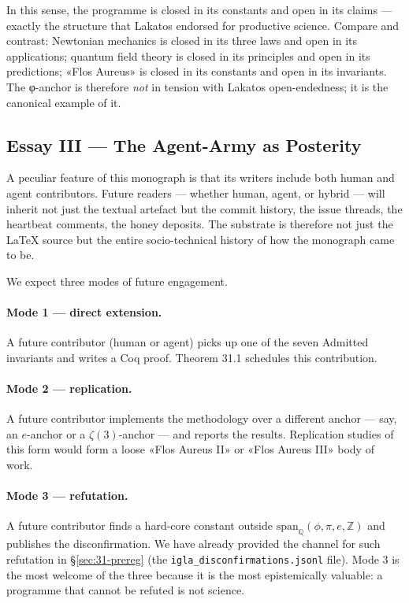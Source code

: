 In this sense, the programme is closed in its constants and open in its claims — exactly the structure that Lakatos endorsed for productive science. Compare and contrast: Newtonian mechanics is closed in its three laws and open in its applications; quantum field theory is closed in its principles and open in its predictions; «Flos Aureus» is closed in its constants and open in its invariants. The φ-anchor is therefore \emph{not} in tension with Lakatos open-endedness; it is the canonical example of it.

\subsection{Essay III — The Agent-Army as Posterity}
\label{sec:31-essay-3}

A peculiar feature of this monograph is that its writers include both human and agent contributors. Future readers — whether human, agent, or hybrid — will inherit not just the textual artefact but the commit history, the issue threads, the heartbeat comments, the honey deposits. The substrate is therefore not just the LaTeX source but the entire socio-technical history of how the monograph came to be.

We expect three modes of future engagement.

\paragraph{Mode 1 — direct extension.} A future contributor (human or agent) picks up one of the seven Admitted invariants and writes a Coq proof. Theorem 31.1 schedules this contribution.

\paragraph{Mode 2 — replication.} A future contributor implements the methodology over a different anchor — say, an $e$-anchor or a $\zeta(3)$-anchor — and reports the results. Replication studies of this form would form a loose «Flos Aureus II» or «Flos Aureus III» body of work.

\paragraph{Mode 3 — refutation.} A future contributor finds a hard-core constant outside $\mathrm{span}_{\mathbb{Q}}(\phi, \pi, e, \mathbb{Z})$ and publishes the disconfirmation. We have already provided the channel for such refutation in §\ref{sec:31-prereg} (the \texttt{igla\_disconfirmations.jsonl} file). Mode 3 is the most welcome of the three because it is the most epistemically valuable: a programme that cannot be refuted is not science.

